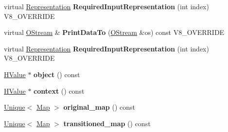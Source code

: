\begin{DoxyCompactItemize}
\item 
\hypertarget{classv8_1_1internal_1_1_v8___f_i_n_a_l_a6c6d1f37f40b113d8f4062f1ffff7215}{}virtual \hyperlink{classv8_1_1internal_1_1_representation}{Representation} {\bfseries Required\+Input\+Representation} (int index) V8\+\_\+\+O\+V\+E\+R\+R\+I\+D\+E\label{classv8_1_1internal_1_1_v8___f_i_n_a_l_a6c6d1f37f40b113d8f4062f1ffff7215}

\item 
\hypertarget{classv8_1_1internal_1_1_v8___f_i_n_a_l_ac450dad970b14246be761ccf5004924b}{}virtual \hyperlink{classv8_1_1internal_1_1_o_stream}{O\+Stream} \& {\bfseries Print\+Data\+To} (\hyperlink{classv8_1_1internal_1_1_o_stream}{O\+Stream} \&os) const V8\+\_\+\+O\+V\+E\+R\+R\+I\+D\+E\label{classv8_1_1internal_1_1_v8___f_i_n_a_l_ac450dad970b14246be761ccf5004924b}

\item 
\hypertarget{classv8_1_1internal_1_1_v8___f_i_n_a_l_a6c6d1f37f40b113d8f4062f1ffff7215}{}virtual \hyperlink{classv8_1_1internal_1_1_representation}{Representation} {\bfseries Required\+Input\+Representation} (int index) V8\+\_\+\+O\+V\+E\+R\+R\+I\+D\+E\label{classv8_1_1internal_1_1_v8___f_i_n_a_l_a6c6d1f37f40b113d8f4062f1ffff7215}

\item 
\hypertarget{classv8_1_1internal_1_1_v8___f_i_n_a_l_a5cf72ed4b954f3413a0aa63069a75283}{}\hyperlink{classv8_1_1internal_1_1_h_value}{H\+Value} $\ast$ {\bfseries object} () const \label{classv8_1_1internal_1_1_v8___f_i_n_a_l_a5cf72ed4b954f3413a0aa63069a75283}

\item 
\hypertarget{classv8_1_1internal_1_1_v8___f_i_n_a_l_a8294bece2df148267ec52228e2139030}{}\hyperlink{classv8_1_1internal_1_1_h_value}{H\+Value} $\ast$ {\bfseries context} () const \label{classv8_1_1internal_1_1_v8___f_i_n_a_l_a8294bece2df148267ec52228e2139030}

\item 
\hypertarget{classv8_1_1internal_1_1_v8___f_i_n_a_l_add1d84ec855354b7e1c010d8b8732edc}{}\hyperlink{classv8_1_1internal_1_1_unique}{Unique}$<$ \hyperlink{classv8_1_1internal_1_1_map}{Map} $>$ {\bfseries original\+\_\+map} () const \label{classv8_1_1internal_1_1_v8___f_i_n_a_l_add1d84ec855354b7e1c010d8b8732edc}

\item 
\hypertarget{classv8_1_1internal_1_1_v8___f_i_n_a_l_a3d31c30db70b013561b4265f89550ced}{}\hyperlink{classv8_1_1internal_1_1_unique}{Unique}$<$ \hyperlink{classv8_1_1internal_1_1_map}{Map} $>$ {\bfseries transitioned\+\_\+map} () const \label{classv8_1_1internal_1_1_v8___f_i_n_a_l_a3d31c30db70b013561b4265f89550ced}


\end{DoxyCompactItemize}
